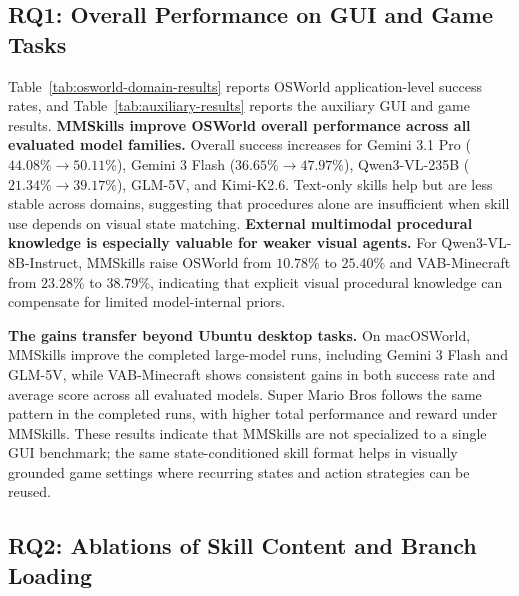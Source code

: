 \documentclass{llmxive}
\begin{document}
\subsection{RQ1: Overall Performance on GUI and Game Tasks}
\label{sec:experiments-desktop}

Table~\ref{tab:osworld-domain-results} reports OSWorld application-level success rates, and Table~\ref{tab:auxiliary-results} reports the auxiliary GUI and game results. \textbf{MMSkills improve OSWorld overall performance across all evaluated model families.} Overall success increases for Gemini 3.1 Pro ($44.08\%\!\to\!50.11\%$), Gemini 3 Flash ($36.65\%\!\to\!47.97\%$), Qwen3-VL-235B ($21.34\%\!\to\!39.17\%$), GLM-5V, and Kimi-K2.6. Text-only skills help but are less stable across domains, suggesting that procedures alone are insufficient when skill use depends on visual state matching. \textbf{External multimodal procedural knowledge is especially valuable for weaker visual agents.} For Qwen3-VL-8B-Instruct, MMSkills raise OSWorld from $10.78\%$ to $25.40\%$ and VAB-Minecraft from $23.28\%$ to $38.79\%$, indicating that explicit visual procedural knowledge can compensate for limited model-internal priors.

\textbf{The gains transfer beyond Ubuntu desktop tasks.} On macOSWorld, MMSkills improve the completed large-model runs, including Gemini 3 Flash and GLM-5V, while VAB-Minecraft shows consistent gains in both success rate and average score across all evaluated models. Super Mario Bros follows the same pattern in the completed runs, with higher total performance and reward under MMSkills. These results indicate that MMSkills are not specialized to a single GUI benchmark; the same state-conditioned skill format helps in visually grounded game settings where recurring states and action strategies can be reused.

\subsection{RQ2: Ablations of Skill Content and Branch Loading}
\label{sec:experiments-ablation}
\end{document}
